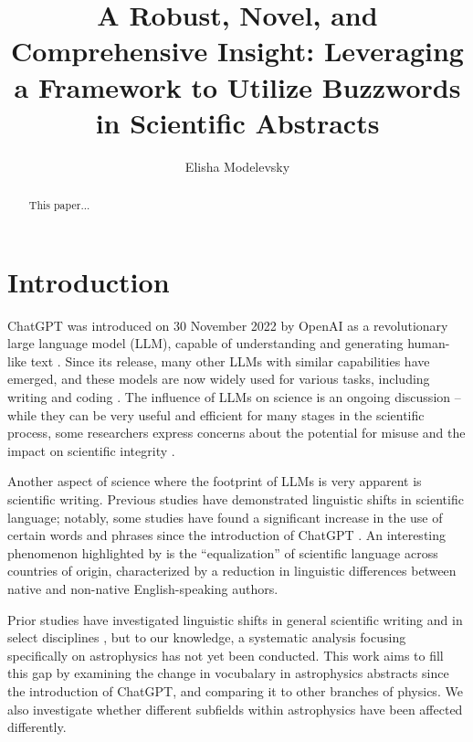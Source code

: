 \documentclass[twocolumn]{aastex701}
\begin{document}
\title{A Robust, Novel, and Comprehensive Insight: Leveraging a Framework to Utilize Buzzwords in Scientific Abstracts}

\author[orcid=0000-0003-4105-3443]{Elisha Modelevsky}

\begin{abstract}

This paper...

\end{abstract}


\section{Introduction} 

ChatGPT was introduced on 30 November 2022 by OpenAI as a revolutionary large language model (LLM), capable of understanding and generating human-like text \citep{Roumeliotis2023}.
Since its release, many other LLMs with similar capabilities have emerged, and these models are now widely used for various tasks, including writing and coding \citep{Minaee2024}.
The influence of LLMs on science is an ongoing discussion -- while they can be very useful and efficient for many stages in the scientific process, some researchers express concerns about the potential for misuse and the impact on scientific integrity \citep{Zhang2025}.

Another aspect of science where the footprint of LLMs is very apparent is scientific writing.
Previous studies have demonstrated linguistic shifts in scientific language;
notably, some studies have found a significant increase in the use of certain words and phrases since the introduction of ChatGPT \citep{Kobak2025,Bao2025,Juzek2024}.
An interesting phenomenon highlighted by \citet{Lin2025} is the ``equalization'' of scientific language across countries of origin, characterized by a reduction in linguistic differences between native and non-native English-speaking authors.

Prior studies have investigated linguistic shifts in general scientific writing and in select disciplines \citep{Xu2024,Kobak2025,Bao2025}, but to our knowledge, a systematic analysis focusing specifically on astrophysics has not yet been conducted.
This work aims to fill this gap by examining the change in vocubalary in astrophysics abstracts since the introduction of ChatGPT, and comparing it to other branches of physics.
We also investigate whether different subfields within astrophysics have been affected differently.
\end{document}
